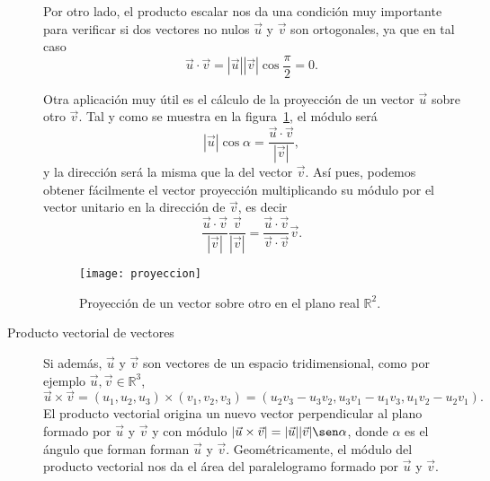 \documentclass[a4paper]{article}
\begin{document}
\begin{description}
Por otro lado, el producto escalar nos da una condición muy importante para
verificar si dos vectores no nulos $\vec{u}$ y $\vec{v}$ son ortogonales, ya
que en tal caso
\[
\vec{u}\cdot\vec{v}=|\vec{u}||\vec{v}|\cos \frac{\pi}{2}=0.\]

Otra aplicación muy útil es el cálculo de la proyección de un
vector $\vec{u}$ sobre otro $\vec{v}$. Tal y como se muestra en la figura~\ref{g:proyeccion}, el
módulo será
\[|\vec{u}|\cos\alpha=\frac{\vec{u}\cdot\vec{v}}{|\vec{v}|},
\]
y la dirección será la misma que la del vector $\vec{v}$. Así pues, podemos
obtener fácilmente el vector proyección multiplicando su módulo por el vector
unitario en la dirección de $\vec{v}$, es decir
\[
\frac{\vec{u}\cdot\vec{v}}{|\vec{v}|}\frac{\vec{v}}{|\vec{v}|}=
\frac{\vec{u}\cdot\vec{v}}{\vec{v}\cdot\vec{v}}\vec{v}.
\]

\begin{figure}[h!]
\begin{center}
\texttt{[image: proyeccion]}
\caption{Proyección de un vector sobre otro en el plano real $\mathbb{R}^2$.}
\label{g:proyeccion}
\end{center}
\end{figure}

\item [Producto vectorial de vectores] Si además, $\vec{u}$ y $\vec{v}$ son vectores
de un espacio tridimensional, como por ejemplo $\vec{u},\vec{v}\in \mathbb{R}^3$,
\[
\vec{u}\times\vec{v}=(u_1,u_2,u_3)\times(v_1,v_2,v_3)=(u_2v_3-u_3v_2,u_3v_1-u_1v_3,u_1v_2-u_2v_1).
\]
El producto vectorial origina un nuevo vector perpendicular al plano formado
por $\vec{u}$ y $\vec{v}$ y con módulo
$|\vec{u}\times\vec{v}|=|\vec{u}||\vec{v}|\sen \alpha$, donde $\alpha$ es el
ángulo que forman forman $\vec{u}$ y $\vec{v}$. Geométricamente, el módulo del
producto vectorial nos da el área del paralelogramo formado por $\vec{u}$ y
$\vec{v}$.

\end{description}
\end{document}
